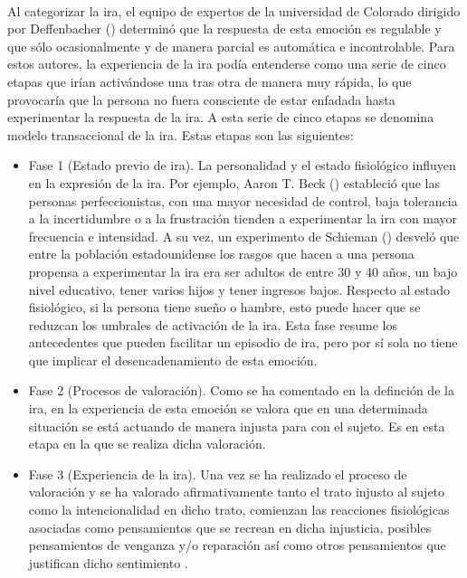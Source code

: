 \paragraph{}
Al categorizar la ira, el equipo de expertos de la universidad de Colorado dirigido por Deffenbacher (\citeyear{deffenbacher2000overcoming}) determinó que la respuesta de esta emoción es regulable y que sólo ocasionalmente y de manera parcial es automática e incontrolable. Para estos autores, la experiencia de la ira podía entenderse como una serie de cinco etapas que irían activándose una tras otra de manera muy rápida, lo que provocaría que la persona no fuera consciente de estar enfadada hasta experimentar la respuesta de la ira. A esta serie de cinco etapas se denomina modelo transaccional de la ira. Estas etapas son las siguientes:

\begin{itemize}
    \item Fase 1 (Estado previo de ira). La personalidad y el estado fisiológico influyen en la expresión de la ira. Por ejemplo, Aaron T. Beck (\citeyear{beck2003prisioneros}) estableció que las personas perfeccionistas, con una mayor necesidad de control, baja tolerancia a la incertidumbre o a la frustración tienden a experimentar la ira con mayor frecuencia e intensidad. A su vez, un experimento de Schieman (\citeyear{schieman2010sociological}) desveló que entre la población estadounidense los rasgos que hacen a una persona propensa a experimentar la ira era ser adultos de entre 30 y 40 años, un bajo nivel educativo, tener varios hijos y tener ingresos bajos. Respecto al estado fisiológico, si la persona tiene sueño o hambre, esto puede hacer que se reduzcan los umbrales de activación de la ira. Esta fase resume los antecedentes que pueden facilitar un episodio de ira, pero por sí sola no tiene que implicar el desencadenamiento de esta emoción.
    
    \item Fase 2 (Procesos de valoración). Como se ha comentado en la definción de la ira, en la experiencia de esta emoción se valora que en una determinada situación se está actuando de manera injusta para con el sujeto. Es en esta etapa en la que se realiza dicha valoración.
    
    \item Fase 3 (Experiencia de la ira). Una vez se ha realizado el proceso de valoración y se ha valorado afirmativamente tanto el trato injusto al sujeto como la intencionalidad en dicho trato, comienzan las reacciones fisiológicas asociadas como pensamientos que se recrean en dicha injusticia, posibles pensamientos de venganza y/o reparación así como otros pensamientos que justifican dicho sentimiento \citep{uceda2011programa}.
    

\end{itemize}
